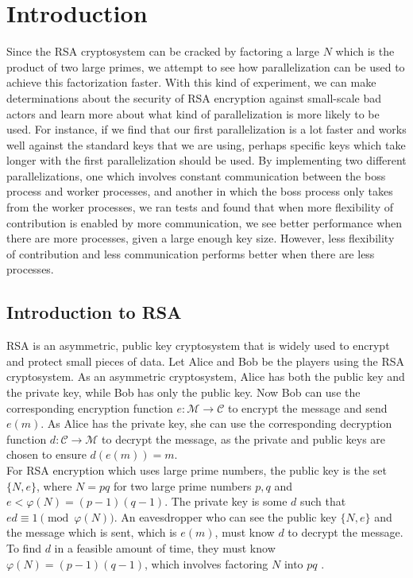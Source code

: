 \documentclass[11pt,twocolumn]{article}
\begin{document}
\section {Introduction}
\indent Since the RSA cryptosystem can be cracked by factoring a large $N$ which is the product of two large primes, we attempt to see how parallelization can be used to achieve this factorization faster. With this kind of experiment, we can make determinations about the security of RSA encryption against small-scale bad actors and learn more about what kind of parallelization is more likely to be used. For instance, if we find that our first parallelization is a lot faster and works well against the standard keys that we are using, perhaps specific keys which take longer with the first parallelization should be used. By implementing two different parallelizations, one which involves constant communication between the boss process and worker processes, and another in which the boss process only takes from the worker processes, we ran tests and found that when more flexibility of contribution is enabled by more communication, we see better performance when there are more processes, given a large enough key size. However, less flexibility of contribution and less communication performs better when there are less processes.

\subsection{Introduction to RSA}
\indent RSA is an asymmetric, public key cryptosystem that is widely used to encrypt and protect small pieces of data. Let Alice and Bob be the players using the RSA cryptosystem. As an asymmetric cryptosystem, Alice has both the public key and the private key, while Bob has only the public key. Now Bob can use the corresponding encryption function $e : \mathcal{M} \to \mathcal{C}$ to encrypt the message and send $e(m)$. As Alice has the private key, she can use the corresponding decryption function $d: \mathcal{C} \to \mathcal{M}$ to decrypt the message, as the private and public keys are chosen to ensure $d(e(m)) = m$. \\
\indent For RSA encryption which uses large prime numbers, the public key is the set $\{N, e \}$, where $N = pq$ for two large prime numbers $p, q$ and $e < \varphi(N) = (p-1)(q-1)$. The private key is some $d$ such that $ed \equiv 1 \pmod{\varphi(N)}$. An eavesdropper who can see the public key $\{N, e \}$ and the message which is sent, which is $e(m)$, must know $d$ to decrypt the message. To find $d$ in a feasible amount of time, they must know $\varphi(N) = (p-1)(q-1)$, which involves factoring $N$ into $pq$ \cite{hoffstein:cryptography}.
\end{document}
